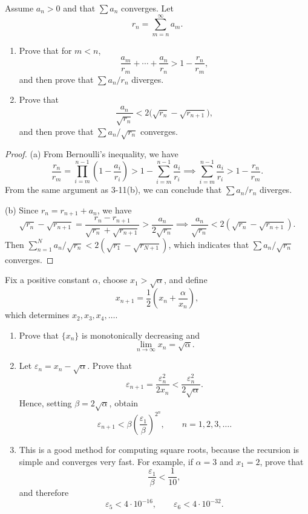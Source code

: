 \documentclass{article}
\begin{document}
\begin{problem}[3-12]
Assume $a_n>0$ and that $\sum a_n$ converges. Let
\[
r_n=\sum_{m=n}^{\infty}a_m.
\]

\begin{enumerate}
\item[(a)] Prove that for $m<n$,
\[
\frac{a_m}{r_m}+\cdots+\frac{a_n}{r_n}>1-\frac{r_n}{r_m},
\]
and then prove that \( \sum {a_n}/{r_n} \) diverges.

\item[(b)] Prove that
\[
\frac{a_n}{\sqrt{r_n}}<2\bigl(\sqrt{r_n}-\sqrt{r_{n+1}}\bigr),
\]
and then prove that \( \sum {a_n}/{\sqrt{r_n}} \) converges.
\end{enumerate}
\end{problem}

\begin{proof}
  (a) From Bernoulli's inequality, we have
  \[ \frac{r_{n}}{r_{m}}=\prod_{i=m}^{n-1}\left(1-\frac{a_{i}}{r_{i}}\right)> 1-\sum_{i=m}^{n-1}\frac{a_{i}}{r_{i}}\implies \sum_{i=m}^{n-1}\frac{a_{i}}{r_{i}}> 1-\frac{r_{n}}{r_{m}}. \]
  From the same argument as 3-11(b), we can conclude that \( \sum {a_n}/{r_n} \) diverges.\par
  (b) Since \( r_n=r_{n+1}+a_n \), we have
  \[ \sqrt{r_n}-\sqrt{r_{n+1}}=\frac{r_{n}-r_{n+1}}{\sqrt{r_n}+\sqrt{r_{n+1}}}> \frac{a_n}{2\sqrt{r_n}}\implies \frac{a_n}{\sqrt{r_n}}<2\left(\sqrt{r_n}-\sqrt{r_{n+1}}\right). \] 
  Then \( \sum_{n=1}^{N}a_n/\sqrt{r_n}<2 \left(\sqrt{r_1}-\sqrt{r_{N+1}}\right) \), which indicates that \( \sum {a_n}/{\sqrt{r_n}} \) converges.
\end{proof}


\begin{problem}[3-16]
Fix a positive constant $\alpha$, choose $x_1 > \sqrt{\alpha}$, and define
\[
x_{n+1} = \frac{1}{2}\left(x_n + \frac{\alpha}{x_n}\right),
\]
which determines $x_2, x_3, x_4, \dots$.

\begin{enumerate}
	\item[(a)] Prove that $\{x_n\}$ is monotonically decreasing and
	\[
	\lim_{n \to \infty} x_n = \sqrt{\alpha}.
	\]

	\item[(b)] Let $\varepsilon_n = x_n - \sqrt{\alpha}$. Prove that
	\[
	\varepsilon_{n+1} = \frac{\varepsilon_n^2}{2x_n} < \frac{\varepsilon_n^2}{2\sqrt{\alpha}}.
	\]
	Hence, setting $\beta = 2\sqrt{\alpha}$, obtain
	\[
	\varepsilon_{n+1} < \beta\left(\frac{\varepsilon_1}{\beta}\right)^{2^n},
	\qquad n=1,2,3,\dots.
	\]

	\item[(c)] This is a good method for computing square roots, because the recursion is simple and converges very fast. For example, if $\alpha = 3$ and $x_1 = 2$, prove that
	\[
	\frac{\varepsilon_1}{\beta} < \frac{1}{10},
	\]
	and therefore
	\[
	\varepsilon_5 < 4\cdot 10^{-16},
	\qquad
	\varepsilon_6 < 4\cdot 10^{-32}.
	\]
\end{enumerate}
\end{problem}
\end{document}
